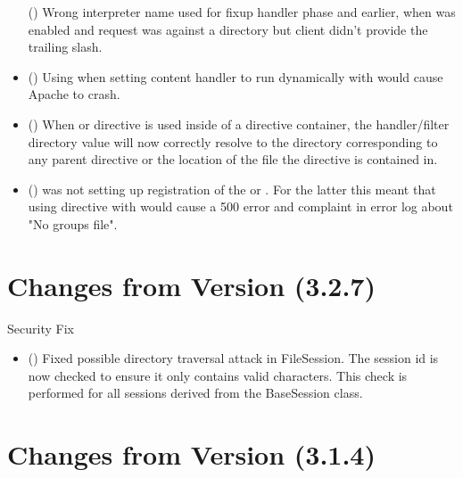 \begin{itemize}
      ()
      Wrong interpreter name used for fixup handler phase and earlier, when
       was enabled and request was against
      a directory but client didn't provide the trailing slash.
    \item
      ()
      Using  when setting content handler to
      run dynamically with  would cause Apache to
      crash.
    \item
      ()
      When  or  directive is used
      inside of a  directive container, the handler/filter
      directory value will now correctly resolve to the directory corresponding
      to any parent  directive or the location of the
       file the  directive is contained in.
    \item
      ()
       was not setting up registration of the
       or . For the
      latter this meant that using  directive with
       would cause a 500 error and complaint in
      error log about "No groups file".
  \end{itemize}

\chapter{Changes from Version (3.2.7)\label{app-changes-from-3.2.7}}


  Security Fix 

  \begin{itemize}
    \item
    ()
    Fixed possible directory traversal attack in FileSession. The session
    id is now checked to ensure it only contains valid characters. This
    check is performed for all sessions derived from the BaseSession 
    class. 
  \end{itemize}

\chapter{Changes from Version (3.1.4)\label{app-changes-from-3.1.4}}


